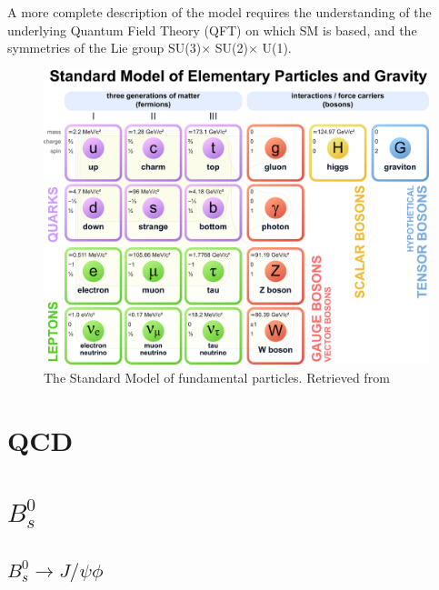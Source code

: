 A more complete description of the model requires the understanding of the underlying Quantum Field Theory (QFT) on which SM is based, and the symmetries of the Lie group SU(3)$ \times$ SU(2)$ \times$ U(1).

\begin{figure}[htp!]
	\centering
	\includegraphics[scale=0.34]{MainContent/Figs/SM.eps}
	\caption{The Standard Model of fundamental particles. Retrieved from}
	\label{fig:sm}
\end{figure}

\section{QCD}
\section{$B^0_s$}
\subsection{$B^0_s \to J/\psi\phi$}
